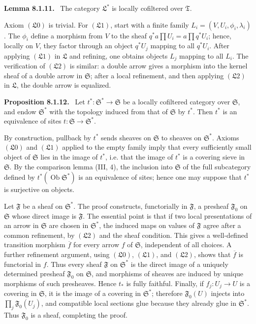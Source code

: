 \documentclass[11pt]{article}
\newcommand{\ob}{\operatorname{Ob}}
\newcommand{\Ss}{\mathfrak{S}}
\newcommand{\Tt}{\mathfrak{T}}
\newcommand{\Ll}{\mathfrak{L}}
\newcommand{\Ff}{\mathfrak{F}}
\newenvironment{statement}[1]{\par\medskip\noindent\textbf{#1.}\ }{\par\medskip}
\begin{document}
\begin{statement}{Lemma 8.1.11}
The category $\Ll^*$ is locally cofiltered over $\Tt$.
\end{statement}

Axiom $(\Ll0)$ is trivial. For $(\Ll1)$, start with a finite family $L_i=(V,U_i,\phi_i,\lambda_i)$. The $\phi_i$ define a morphism from $V$ to the sheaf $q^*a\prod U_i=a\prod q^*U_i$; hence, locally on $V$, they factor through an object $q^*U_j$ mapping to all $q^*U_i$. After applying $(\Ll1)$ in $\Ll$ and refining, one obtains objects $L_j$ mapping to all $L_i$. The verification of $(\Ll2)$ is similar: a double arrow gives a morphism into the kernel sheaf of a double arrow in $\Ss$; after a local refinement, and then applying $(\Ll2)$ in $\Ll$, the double arrow is equalized.

\begin{statement}{Proposition 8.1.12}
Let $t^*:\Ss^*\to\Ss$ be a locally cofiltered category over $\Ss$, and endow $\Ss^*$ with the topology induced from that of $\Ss$ by $t^*$. Then $t^*$ is an equivalence of sites $t:\Ss\to\Ss^*$.
\end{statement}

By construction, pullback by $t^*$ sends sheaves on $\Ss$ to sheaves on $\Ss^*$. Axioms $(\Ll0)$ and $(\Ll1)$ applied to the empty family imply that every sufficiently small object of $\Ss$ lies in the image of $t^*$, i.e. that the image of $t^*$ is a covering sieve in $\Ss$. By the comparison lemma (III, 4), the inclusion into $\Ss$ of the full subcategory defined by $t^*(\ob\Ss^*)$ is an equivalence of sites; hence one may suppose that $t^*$ is surjective on objects.

Let $\Ff$ be a sheaf on $\Ss^*$. The proof constructs, functorially in $\Ff$, a presheaf $\Ff_0$ on $\Ss$ whose direct image is $\Ff$. The essential point is that if two local presentations of an arrow in $\Ss$ are chosen in $\Ss^*$, the induced maps on values of $\Ff$ agree after a common refinement, by $(\Ll2)$ and the sheaf condition. This gives a well-defined transition morphism $\overline f$ for every arrow $f$ of $\Ss$, independent of all choices. A further refinement argument, using $(\Ll0)$, $(\Ll1)$, and $(\Ll2)$, shows that $\overline f$ is functorial in $f$. Thus every sheaf $\Ff$ on $\Ss^*$ is the direct image of a uniquely determined presheaf $\Ff_0$ on $\Ss$, and morphisms of sheaves are induced by unique morphisms of such presheaves. Hence $t_*$ is fully faithful. Finally, if $f_j:U_j\to U$ is a covering in $\Ss$, it is the image of a covering in $\Ss^*$; therefore $\Ff_0(U)$ injects into $\prod_j\Ff_0(U_j)$, and compatible local sections glue because they already glue in $\Ss^*$. Thus $\Ff_0$ is a sheaf, completing the proof.
\end{document}
